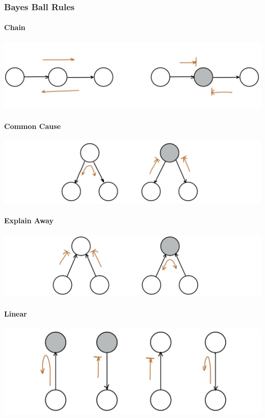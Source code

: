 \documentclass[11pt]{article}
\begin{document}
\subsubsection{Bayes Ball Rules}
\paragraph{Chain}
\begin{center}
    \includegraphics[scale=0.25]{img/bayes_ball_chain}
\end{center}
\paragraph{Common Cause}
\begin{center}
    \includegraphics[scale=0.25]{img/bayes_ball_common_cause}
\end{center}
\paragraph{Explain Away}
\begin{center}
    \includegraphics[scale=0.25]{img/bayes_ball_explain_away}
\end{center}
\paragraph{Linear}
\begin{center}
    \includegraphics[scale=0.25]{img/bayes_ball_linear}
\end{center}
\end{document}
